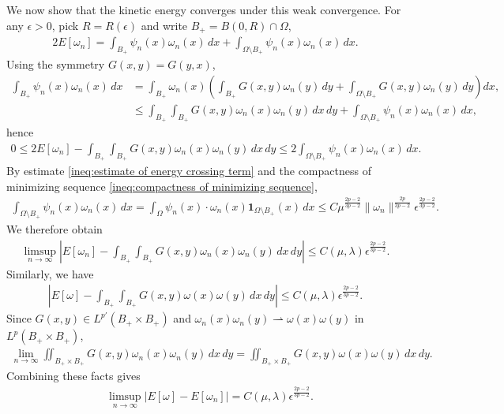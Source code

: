 \documentclass[11pt,letterpaper]{amsart}
\theoremstyle{definition}
\theoremstyle{remark}
\renewcommand{\O}{\Omega}
\newcommand{\eps}{\epsilon}
\numberwithin{equation}{section}
\begin{document}
We now show that the kinetic energy converges under this weak convergence. For any $\eps>0$, pick $R=R(\eps)$ and write $B_+ = B(0,R) \cap \O$,
\begin{align*}
    2E[\omega_n]= \int_{B_+} \psi_n(x) \omega_n(x) \,dx + \int_{\O \setminus B_+} \psi_n(x) \omega_n(x) \,dx.
\end{align*}
Using the symmetry $G(x,y) = G(y,x)$, 
\begin{align*}
    \int_{B_+} \psi_n(x) \omega_n(x) \,dx
    &= \int_{B_+} \omega_n(x) \left( \int_{B_+} G(x,y) \omega_n(y) \,dy + \int_{\O \setminus B_+} G(x,y) \omega_n(y) \,dy \right) dx, \\
    &\leq \int_{B_+} \int_{B_+} G(x,y) \omega_n(x) \omega_n(y) \,dx\,dy + \int_{\O \setminus B_+} \psi_n(x) \omega_n(x) \,dx,
\end{align*}
hence
\begin{align*}
    0 \leq 2E[\omega_n] - \int_{B_+} \int_{B_+} G(x,y) \omega_n(x) \omega_n(y) \,dx\,dy  \leq 2 \int_{\O\setminus B_+} \psi_n(x) \omega_n(x) \,dx.
\end{align*}
By estimate \eqref{ineq:estimate of energy crossing term} and the compactness of minimizing sequence \eqref{ineq:compactness of minimizing sequence}, 
\begin{align*}
    \int_{\O\setminus B_+} \psi_n(x) \omega_n(x) \,dx = \int_{\O} \psi_n(x) \cdot \omega_n(x)\mathbf{1}_{\O\setminus B_+}(x) \,dx \leq C\mu^{\frac{2p-2}{3p-2}}\|\omega_n\|^{\frac{2p}{3p-2}}\eps^{\frac{2p-2}{3p-2}}.
\end{align*}
We therefore obtain
\begin{align*}
    \limsup_{n\to \infty}\left| E[\omega_n] - \int_{B_+} \int_{B_+} G(x,y) \omega_n(x) \omega_n(y) \,dx\,dy \right| \leq C(\mu,\lambda)\eps^{\frac{2p-2}{3p-2}}.
\end{align*}
Similarly, we have
\begin{align*}
    \left| E[\omega] - \int_{B_+} \int_{B_+} G(x,y) \omega(x) \omega(y) \,dx\,dy \right| \leq C(\mu,\lambda)\eps^{\frac{2p-2}{3p-2}}.
\end{align*}
Since $G(x,y) \in L^{p'}(B_+ \times B_+)$ and $\omega_n(x) \omega_n(y) \rightharpoonup \omega(x) \omega(y)$ in $L^p(B_+ \times B_+)$, 
\begin{align*}
    \lim_{n\to\infty}\iint_{B_+\times B_+}G(x,y)\omega_n(x)\omega_n(y)\,dx\,dy =\iint_{B_+\times B_+}G(x,y)\omega(x)\omega(y)\,dx\,dy.
\end{align*}
Combining these facts gives
\begin{align*}
    & \limsup_{n\to \infty} \left| E[\omega] - E[\omega_n] \right| = C(\mu,\lambda)\eps^{\frac{2p-2}{3p-2}}.
\end{align*}
\end{document}
